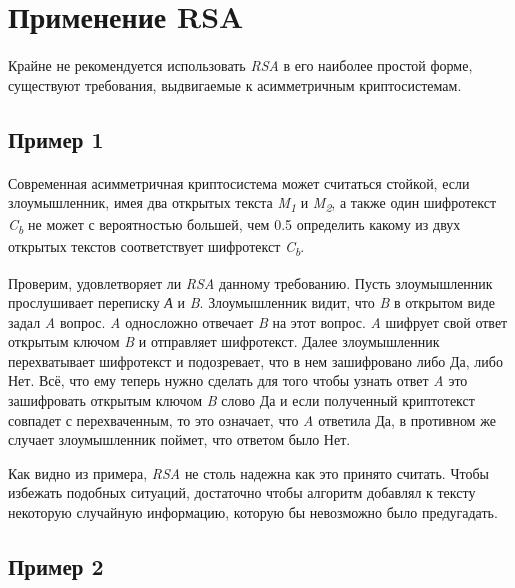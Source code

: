 \section{Применение RSA}

\paragraph{} Крайне не рекомендуется использовать \textit{RSA} в его наиболее простой форме, существуют требования, выдвигаемые к асимметричным криптосистемам.

\subsection{Пример 1}

\paragraph{} Современная асимметричная криптосистема может считаться стойкой, если злоумышленник, имея два открытых текста \textit{M\textsubscript{1}} и \textit{M\textsubscript{2}}, а также один шифротекст \textit{C\textsubscript{b}} не может с вероятностью большей, чем 0.5 определить какому из двух открытых текстов соответствует шифротекст \textit{C\textsubscript{b}}.

Проверим, удовлетворяет ли \textit{RSA} данному требованию. Пусть злоумышленник прослушивает переписку \textit{А} и \textit{B}. Злоумышленник видит, что \textit{B} в открытом виде задал \textit{A} вопрос. \textit{A} односложно отвечает \textit{B} на этот вопрос. \textit{A} шифрует свой ответ открытым ключом \textit{B} и отправляет шифротекст. Далее злоумышленник перехватывает шифротекст и подозревает, что в нем зашифровано либо Да, либо Нет. Всё, что ему теперь нужно сделать для того чтобы узнать ответ \textit{A} это зашифровать открытым ключом \textit{B} слово Да и если полученный криптотекст совпадет с перехваченным, то это означает, что \textit{A} ответила Да, в противном же случает злоумышленник поймет, что ответом было Нет.

Как видно из примера, \textit{RSA} не столь надежна как это принято считать. Чтобы избежать подобных ситуаций, достаточно чтобы алгоритм добавлял к тексту некоторую случайную информацию, которую бы невозможно было предугадать. 

\subsection{Пример 2}

